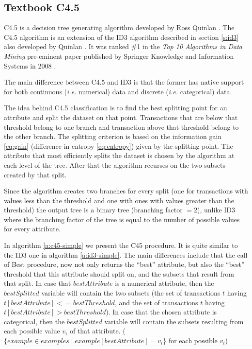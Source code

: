 \subsection{Textbook C4.5}\label{s:c45}
C4.5 is a decision tree generating algorithm developed by Ross Quinlan \cite{quinlan1993c4}.
The C4.5 algorithm is an extension of the ID3 algorithm described in section \ref{s:id3} also developed by Quinlan \cite{quinlan1986induction}.
It was ranked \#1 in the \textit{Top 10 Algorithms in Data Mining} pre\hyp eminent paper published by Springer Knowledge and Information Systems in 2008 \cite{wu2008top}.

The main difference between C4.5 and ID3 is that the former has native support for both continuous (\textit{i.e.} numerical) data and discrete (\textit{i.e.} categorical) data.

The idea behind C4.5 classification is to find the best splitting point for an attribute and split the dataset on that point.
Transactions that are below that threshold belong to one branch and transaction above that threshold belong to the other branch.
The splitting criterion is based on the information gain \ref{eq:gain} (difference in entropy \ref{eq:entropy}) given by the splitting point.
The attribute that most efficiently splits the dataset is chosen by the algorithm at each level of the tree.
After that the algorithm recurses on the two subsets created by that split.

Since the algorithm creates two branches for every split (one for transactions with values less than the threshold and one with ones with values greater than the threshold) the output tree is a binary tree (branching factor $= 2$), unlike ID3 where the branching factor of the tree is equal to the number of possible values for every attribute.

In algorithm \ref{a:c45-simple} we present the \f{C45} procedure.
It is quite similar to the \f{ID3} one in algorithm \ref{a:id3-simple}.
The main differences include that the call of \f{Best} procedure, now not only returns the ``best'' attribute, but also the ``best'' threshold that this attribute should split on, and the subsets that result from that split.
In case that $bestAttribute$ is a numerical attribute, then the $bestSplitted$ variable will contain the two subsets (the set of transactions $t$ having $t[bestAttribute] <= bestThreshold$, and the set of transactions $t$ having $t[bestAttribute] > bestThreshold$).
In case that the chosen attribute is categorical, then the $bestSplitted$ variable will contain the subsets resulting from each possible value $v_i$ of that attribute. ($\{example \in examples \mid example[bestAttribute] = v_i\}$ for each possible $v_i$)

